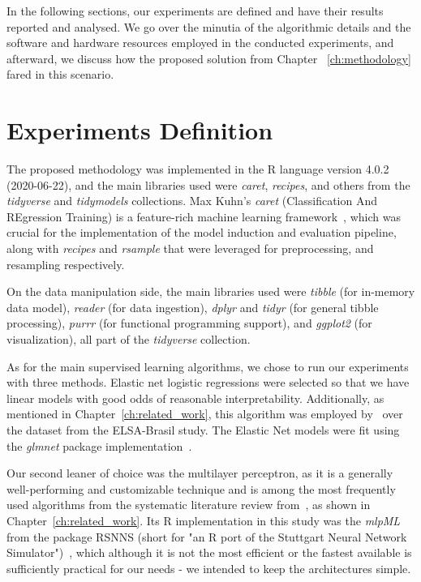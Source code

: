 In the following sections, our experiments are defined and have their results reported and analysed.
We go over the minutia of the algorithmic details and the software and hardware resources employed in the conducted experiments, and afterward, we discuss how the proposed solution from Chapter ~\ref{ch:methodology} fared in this scenario.


\section{Experiments Definition}\label{sec:experiments-definition}

The proposed methodology was implemented in the R language version 4.0.2 (2020-06-22), and the main libraries used were \textit{caret}, \textit{recipes}, and others from the \textit{tidyverse} and \textit{tidymodels} collections.
Max Kuhn's \textit{caret} (Classification And REgression Training) is a feature-rich machine learning framework~\cite{Kuhn2008}, which was crucial for the implementation of the model induction and evaluation pipeline, along with \textit{recipes} and \textit{rsample} that were leveraged for preprocessing, and resampling respectively.

On the data manipulation side, the main libraries used were \textit{tibble} (for in-memory data model), \textit{reader} (for data ingestion), \textit{dplyr} and \textit{tidyr} (for general tibble processing), \textit{purrr} (for functional programming support), and \textit{ggplot2} (for visualization), all part of the \textit{tidyverse} collection.

As for the main supervised learning algorithms, we chose to run our experiments with three methods.
Elastic net logistic regressions were selected so that we have linear models with good odds of reasonable interpretability.
Additionally, as mentioned in Chapter~\ref{ch:related_work}, this algorithm was employed by~\citet{Librenza-Garcia2020} over the dataset from the ELSA-Brasil study.
The Elastic Net models were fit using the \textit{glmnet} package implementation~\cite{Friedman2010}.

Our second leaner of choice was the multilayer perceptron, as it is a generally well-performing and customizable technique and is among the most frequently used algorithms from the systematic literature review from~\citet{Burke2019}, as shown in Chapter~\ref{ch:related_work}.
Its R implementation in this study was the \textit{mlpML} from the package RSNNS (short for "an R port of the Stuttgart Neural Network Simulator")~\cite{Bergmeir2012}, which although it is not the most efficient or the fastest available is sufficiently practical for our needs - we intended to keep the architectures simple.

